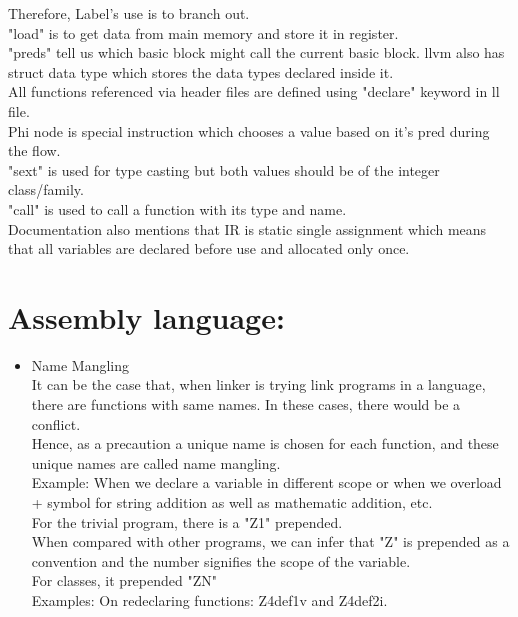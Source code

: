 \documentclass[12pt]{article}
\begin{document}
\begin{itemize}
Therefore, Label's use is to branch out.\\
"load" is to get data from main memory and store it in register.\\
"preds" tell us which basic block might call the current basic block.
llvm also has struct data type which stores the data types declared inside it.\\
All functions referenced via header files are defined using "declare" keyword in ll file.\\
Phi node is special instruction which chooses a value based on it's pred during the flow.\\
"sext" is used for type casting but both values should be of the integer class/family.\\
"call" is used to call a function with its type and name.\\
Documentation also mentions that IR is static single assignment which means that all variables are declared before use and allocated only once.\\
\end{itemize}

\section {Assembly language:}
\begin{itemize}
\item Name Mangling\\
It can be the case that, when linker is trying link programs in a language, there are functions with same names. In these cases, there would be a conflict.\\
Hence, as a precaution a unique name is chosen for each function, and these unique names are called name mangling.\\
Example: When we declare a variable in different scope or when we overload + symbol for string addition as well as mathematic addition, etc.\\
For the trivial program, there is a "\textunderscore Z1" prepended.\\
When compared with other programs, we can infer that "\textunderscore Z" is prepended as a convention and the number signifies the scope of the variable.\\
For classes, it prepended "\textunderscore ZN"\\
Examples: On redeclaring functions: \textunderscore Z4def1v and \textunderscore Z4def2i.

\end{itemize}
\end{document}
